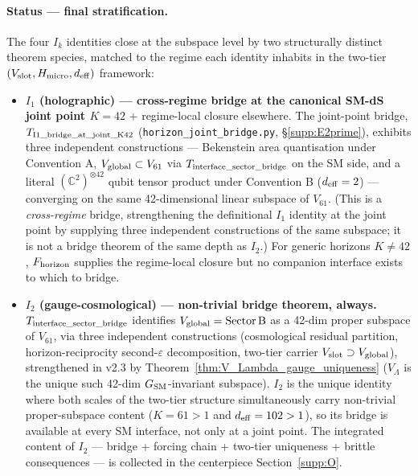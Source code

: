 \documentclass[11pt]{article}
\theoremstyle{plain}
\theoremstyle{definition}
\theoremstyle{remark}
\begin{document}
\paragraph{Status --- final stratification.}
The four $I_k$ identities close at the subspace level by two structurally distinct theorem species, matched to the regime each identity inhabits in the two-tier $(V_{\rm slot}, H_{\rm micro}, d_{\rm eff})$ framework:
\begin{itemize}[leftmargin=2.5em]
  \item \textbf{$I_1$ (holographic) --- cross-regime bridge at the canonical SM-dS joint point $K = 42$} + regime-local closure elsewhere.  The joint-point bridge, $T_{\rm I1\_bridge\_at\_joint\_K42}$ (\texttt{horizon\_joint\_bridge.py}, \S\ref{supp:E2prime}), exhibits three independent constructions --- Bekenstein area quantisation under Convention A, $V_{\rm global} \subset V_{61}$ via $T_{\rm interface\_sector\_bridge}$ on the SM side, and a literal $(\mathbb{C}^2)^{\otimes 42}$ qubit tensor product under Convention B ($d_{\rm eff} = 2$) --- converging on the same 42-dimensional linear subspace of $V_{61}$.  (This is a \emph{cross-regime} bridge, strengthening the definitional $I_1$ identity at the joint point by supplying three independent constructions of the same subspace; it is not a bridge theorem of the same depth as $I_2$.)  For generic horizons $K \neq 42$, $F_{\rm horizon}$ supplies the regime-local closure but no companion interface exists to which to bridge.
  \item \textbf{$I_2$ (gauge-cosmological) --- non-trivial bridge theorem, always.}  $T_{\rm interface\_sector\_bridge}$ identifies $V_{\rm global} = \text{Sector\,B}$ as a 42-dim proper subspace of $V_{61}$, via three independent constructions (cosmological residual partition, horizon-reciprocity second-$\varepsilon$ decomposition, two-tier carrier $V_{\rm slot} \supset V_{\rm global}$), strengthened in v2.3 by Theorem~\ref{thm:V_Lambda_gauge_uniqueness} ($V_\Lambda$ is the unique such 42-dim $G_{\rm SM}$-invariant subspace).  $I_2$ is the unique identity where both scales of the two-tier structure simultaneously carry non-trivial proper-subspace content ($K = 61 > 1$ and $d_{\rm eff} = 102 > 1$), so its bridge is available at every SM interface, not only at a joint point.  The integrated content of $I_2$ --- bridge + forcing chain + two-tier uniqueness + brittle consequences --- is collected in the centerpiece Section~\ref{supp:O}.

\end{itemize}
\end{document}
